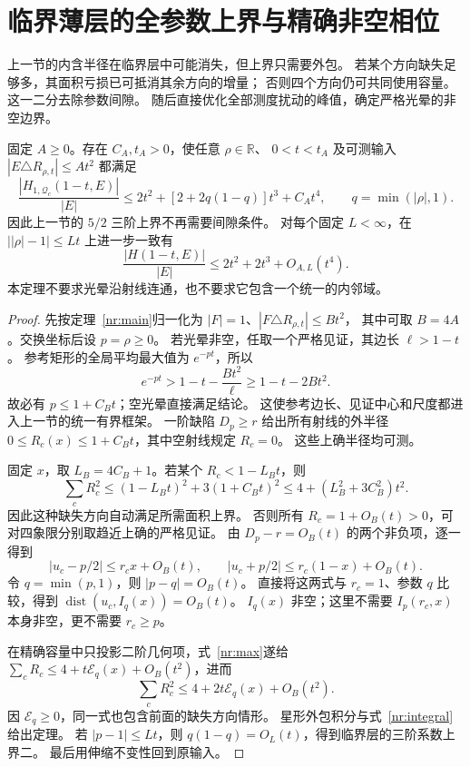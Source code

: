 \section{临界薄层的全参数上界与精确非空相位}\label{cr:section}

上一节的内含半径在临界层中可能消失，但上界只需要外包。
若某个方向缺失足够多，其面积亏损已可抵消其余方向的增量；
否则四个方向仍可共同使用容量。这一二分去除参数间隙。
随后直接优化全部测度扰动的峰值，确定严格光晕的非空边界。

\begin{theorem}[任意偏心参数的统一上界]\label{cr:upper}
固定 $A\ge0$。存在 $C_A,t_A>0$，使任意 $\rho\in\mathbb R$、
$0<t<t_A$ 及可测输入 $|E\triangle R_{\rho,t}|\le At^2$ 都满足
\begin{equation}\label{cr:clipped}
 \frac{|H_{1,\mathcal Q_c}(1-t,E)|}{|E|}
 \le2t^2+[2+2q(1-q)]t^3+C_At^4,
 \qquad q=\min(|\rho|,1).
\end{equation}
因此上一节的 $5/2$ 三阶上界不再需要间隙条件。
对每个固定 $L<\infty$，在 $\big||\rho|-1\big|\le Lt$ 上进一步一致有
\[
 \frac{|H(1-t,E)|}{|E|}\le2t^2+2t^3+O_{A,L}(t^4).
\]
本定理不要求光晕沿射线连通，也不要求它包含一个统一的内邻域。
\end{theorem}

\begin{proof}
先按定理~\ref{nr:main}归一化为 $|F|=1$、$|F\triangle R_{\rho,t}|\le Bt^2$，
其中可取 $B=4A$。交换坐标后设 $p=\rho\ge0$。
若光晕非空，任取一个严格见证，其边长 $\ell>1-t$。
参考矩形的全局平均最大值为 $e^{-pt}$，所以
\[
 e^{-pt}>1-t-\frac{Bt^2}{\ell}\ge1-t-2Bt^2.
\]
故必有 $p\le1+C_Bt$；空光晕直接满足结论。
这使参考边长、见证中心和尺度都进入上一节的统一有界框架。
一阶缺陷 $D_p\ge r$ 给出所有射线的外半径
$0\le R_c(x)\le1+C_Bt$，其中空射线规定 $R_c=0$。
这些上确半径均可测。

固定 $x$，取 $L_B=4C_B+1$。若某个 $R_c<1-L_Bt$，则
\[
 \sum_cR_c^2\le(1-L_Bt)^2+3(1+C_Bt)^2
 \le4+(L_B^2+3C_B^2)t^2.
\]
因此这种缺失方向自动满足所需面积上界。
否则所有 $R_c=1+O_B(t)>0$，可对四象限分别取趋近上确的严格见证。
由 $D_p-r=O_B(t)$ 的两个非负项，逐一得到
\[
 |u_c-p/2|\le r_cx+O_B(t),\qquad
 |u_c+p/2|\le r_c(1-x)+O_B(t).
\]
令 $q=\min(p,1)$，则 $|p-q|=O_B(t)$。
直接将这两式与 $r_c=1$、参数 $q$ 比较，得到
$\operatorname{dist}(u_c,I_q(x))=O_B(t)$。
$I_q(x)$ 非空；这里不需要 $I_p(r_c,x)$ 本身非空，更不需要 $r_c\ge p$。

在精确容量中只投影二阶几何项，式~\eqref{nr:max}遂给
$\sum_cR_c\le4+t\mathcal E_q(x)+O_B(t^2)$，进而
\[
 \sum_cR_c^2\le4+2t\mathcal E_q(x)+O_B(t^2).
\]
因 $\mathcal E_q\ge0$，同一式也包含前面的缺失方向情形。
星形外包积分与式~\eqref{nr:integral}给出定理。
若 $|p-1|\le Lt$，则 $q(1-q)=O_L(t)$，得到临界层的三阶系数上界二。
最后用伸缩不变性回到原输入。
\end{proof}

